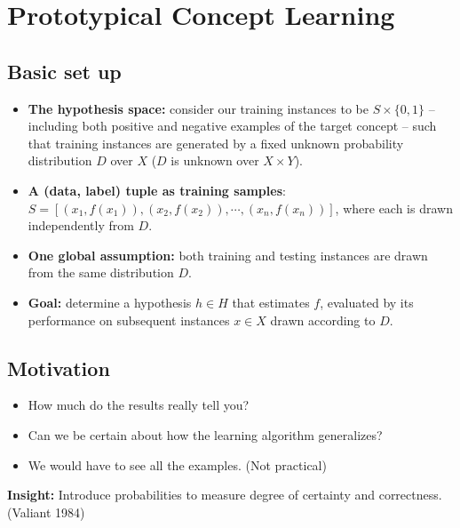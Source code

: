 \documentclass[12pt, a4paper, oneside]{article}
\begin{document}

\setcounter{page}{1}

\section[Section title sans citation]{Prototypical Concept Learning}

\subsection{Basic set up}
\begin{itemize}
    \item \textbf{The hypothesis space:} consider our training instances to be $S \times \{0, 1\}$ – including both positive and negative
    examples of the target concept – such that training instances are generated by a fixed unknown probability distribution $D$ over $X$ ($D$ is unknown over $X \times Y$).
    \item \textbf{A (data, label) tuple as training samples}: 
    \\$S = [(x_1, f(x_1)), (x_2, f(x_2)),\cdots,(x_n, f(x_n))]$, where each is drawn independently from $D$.
    \item \textbf{One global assumption:} both training and testing instances are drawn from the same distribution $D$.
    \item \textbf{Goal:} determine a hypothesis $h \in H$ that estimates $f$, evaluated by its performance on subsequent instances $x \in X$ drawn according to $D$.
\end{itemize}

\subsection{Motivation}
\begin{itemize}
    \item How much do the results really tell you?
    \item Can we be certain about how the learning algorithm generalizes? 
    \item We would have to see all the examples. (Not practical)
\end{itemize}
\textbf{Insight:} Introduce probabilities to measure degree of certainty and 
correctness. (Valiant 1984)
\end{document}
